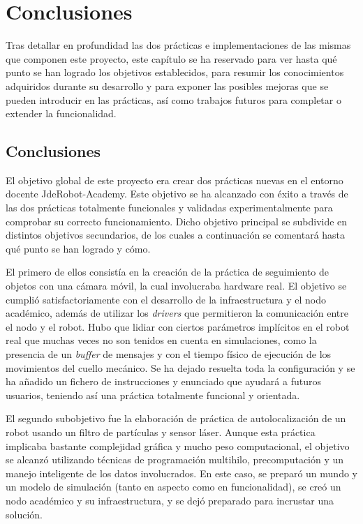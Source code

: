 \chapter{Conclusiones}\label{cap.conclusiones}
Tras detallar en profundidad las dos prácticas e implementaciones de las mismas que componen este proyecto, este capítulo se ha reservado para ver hasta qué punto se han logrado los objetivos establecidos, para resumir los conocimientos adquiridos durante su desarrollo y para exponer las posibles mejoras que se pueden introducir en las prácticas, así como trabajos futuros para completar o extender la funcionalidad.

\section{Conclusiones}
El objetivo global de este proyecto era crear dos prácticas nuevas en el entorno docente JdeRobot-Academy. Este objetivo se ha alcanzado con éxito a través de las dos prácticas totalmente funcionales y validadas experimentalmente para comprobar su correcto funcionamiento. Dicho objetivo principal se subdivide en distintos objetivos secundarios, de los cuales a continuación se comentará hasta qué punto se han logrado y cómo. 

El primero de ellos consistía en la creación de la práctica de seguimiento de objetos con una
cámara móvil, la cual  involucraba hardware real. El objetivo se cumplió satisfactoriamente con el desarrollo de la infraestructura y el nodo académico, además de utilizar los \textit{drivers} que permitieron la comunicación entre el nodo y el robot. Hubo que lidiar con ciertos parámetros implícitos en el robot real que muchas veces no son tenidos en cuenta en simulaciones, como la presencia de un \textit{buffer} de mensajes y con el tiempo físico de ejecución de los movimientos del cuello mecánico. Se ha dejado resuelta toda la configuración y se ha añadido un fichero de instrucciones y enunciado que ayudará a futuros usuarios, teniendo así una práctica totalmente funcional y orientada.

El segundo subobjetivo fue la elaboración de práctica de autolocalización de un robot usando
un filtro de partículas y sensor láser. Aunque esta práctica implicaba bastante complejidad gráfica y mucho peso computacional, el objetivo se alcanzó utilizando técnicas de programación multihilo, precomputación y un manejo inteligente de los datos involucrados. En este caso, se preparó un mundo y un modelo de simulación (tanto en aspecto como en funcionalidad), se creó un nodo académico y su infraestructura, y se dejó preparado para incrustar una solución. 

